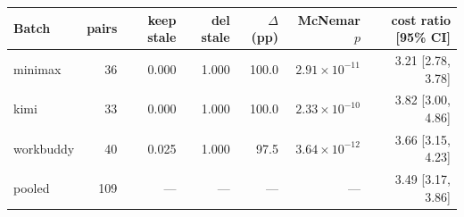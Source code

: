 \begin{tabular}{lrrrrrr}
\toprule
Batch & pairs & keep stale & del stale & $\Delta$ (pp) & McNemar $p$ & cost ratio [95\% CI] \\
\midrule
minimax & 36 & 0.000 & 1.000 & 100.0 & $2.91\times10^{-11}$ & 3.21 [2.78, 3.78] \\
kimi & 33 & 0.000 & 1.000 & 100.0 & $2.33\times10^{-10}$ & 3.82 [3.00, 4.86] \\
workbuddy & 40 & 0.025 & 1.000 & 97.5 & $3.64\times10^{-12}$ & 3.66 [3.15, 4.23] \\
\midrule
pooled & 109 & --- & --- & --- & --- & 3.49 [3.17, 3.86] \\
\bottomrule
\end{tabular}
